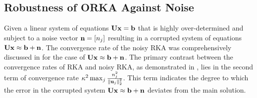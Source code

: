 \documentclass[12pt,draftcls,onecolumn]{IEEEtran}
\begin{document}
\subsection{Robustness of ORKA Against Noise}
\label{sec_noisy_a}
Given a linear system  of equations $\mathbf{U}\mathbf{x}=\mathbf{b}$ that is highly over-determined and subject to a noise vector $\mathbf{n}=[n_{j}]$ resulting in a corrupted system of equations $\mathbf{U}\mathbf{x}\approx\mathbf{b}+\mathbf{n}$.
The convergence rate of the noisy RKA was comprehensively discussed in \cite[Theorem~2.1]{needell2010randomized} for the case of $\mathbf{U}\mathbf{x}\approx\mathbf{b}+\mathbf{n}$.
The primary contrast between the convergence rates of RKA
and noisy RKA, as demonstrated in \cite[Theorem~2.1]{needell2010randomized}, lies in the second term of convergence rate $\kappa^2\max_{j}\frac{n^{2}_j}{\left\|\mathbf{u}_j\right\|^2_2}$. This term indicates the degree to which the error in the corrupted system $\mathbf{U}\mathbf{x}\approx\mathbf{b}+\mathbf{n}$ deviates from the main solution. 
\end{document}
